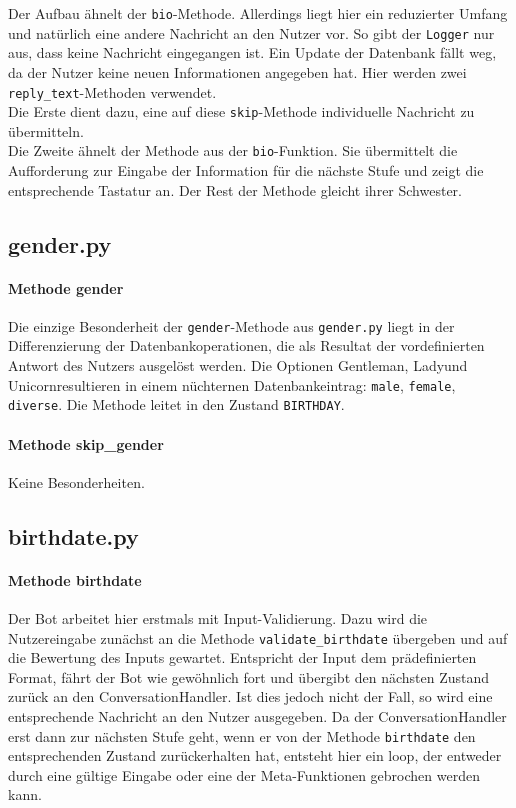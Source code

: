                 Der Aufbau ähnelt der \verb|bio|-Methode. Allerdings liegt hier ein reduzierter Umfang und natürlich eine andere Nachricht an den Nutzer vor. So gibt der \verb|Logger| nur aus, dass keine Nachricht eingegangen ist. Ein Update der Datenbank fällt weg, da der Nutzer keine neuen Informationen angegeben hat. Hier werden zwei \verb|reply_text|-Methoden verwendet. \\
                Die Erste dient dazu, eine auf diese \verb|skip|-Methode individuelle Nachricht zu übermitteln. \\
                Die Zweite ähnelt der Methode aus der \verb|bio|-Funktion. Sie übermittelt die Aufforderung zur Eingabe der Information für die nächste Stufe und zeigt die entsprechende Tastatur an. Der Rest der Methode gleicht ihrer Schwester.


        \subsection{gender.py} \label{gernder.py}
            \paragraph{Methode gender}
                Die einzige Besonderheit der \verb|gender|-Methode aus \verb|gender.py| liegt in der Differenzierung der Datenbankoperationen, die als Resultat der vordefinierten Antwort des Nutzers ausgelöst werden. Die Optionen \glqq Gentleman\grqq, \glqq Lady\grqq und \glqq Unicorn\grqq resultieren in einem nüchternen Datenbankeintrag: \verb|male|, \verb|female|, \verb|diverse|. Die Methode leitet in den Zustand \verb|BIRTHDAY|.
            
            \paragraph{Methode skip\_gender}
                Keine Besonderheiten. 
        

        \subsection{birthdate.py} \label{birthdate.py}
            \paragraph{Methode birthdate}
                Der Bot arbeitet hier erstmals mit Input-Validierung. Dazu wird die Nutzereingabe zunächst an die Methode \verb|validate_birthdate| übergeben und auf die Bewertung des Inputs gewartet. Entspricht der Input dem prädefinierten Format, fährt der Bot wie gewöhnlich fort und übergibt den nächsten Zustand zurück an den ConversationHandler. Ist dies jedoch nicht der Fall, so wird eine entsprechende Nachricht an den Nutzer ausgegeben. Da der ConversationHandler erst dann zur nächsten Stufe geht, wenn er von der Methode \verb|birthdate| den entsprechenden Zustand zurückerhalten hat, entsteht hier ein loop, der entweder durch eine gültige Eingabe oder eine der Meta-Funktionen gebrochen werden kann.
        
